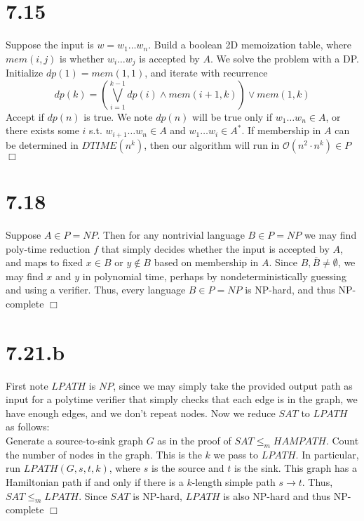 \documentclass{article}
\begin{document}
\section*{7.15}
Suppose the input is $w = w_1 \dots w_n$. Build a boolean 2D memoization table, where $mem(i,j)$ is whether $w_i\dots w_j$ is accepted by $A$. We solve the problem with a DP. Initialize $dp(1) = mem(1,1)$, and iterate with recurrence
$$dp(k) = \left(\bigvee_{i=1}^{k-1} dp(i) \wedge mem(i+1,k)\right) \vee mem(1,k)$$
Accept if $dp(n)$ is true. We note $dp(n)$ will be true only if $w_1 \dots w_n \in A$, or there exists some $i$ s.t. $w_{i+1}\dots w_n \in A$ and $w_1\dots w_i \in A^*$. If membership in $A$ can be determined in $DTIME(n^k)$, then our algorithm will run in $\mathcal{O}(n^2 \cdot n^k) \in P$ $\Box$

\section*{7.18}
Suppose $A \in P = NP$. Then for any nontrivial language $B \in P = NP$ we may find poly-time reduction $f$ that simply decides whether the input is accepted by $A$, and maps to fixed $x \in B$ or $y \notin B$ based on membership in $A$. Since $B,\overline{B} \neq \emptyset$, we may find $x$ and $y$ in polynomial time, perhaps by nondeterministically guessing and using a verifier. Thus, every language $B \in P = NP$ is NP-hard, and thus NP-complete $\Box$

\section*{7.21.b}
First note $LPATH$ is $NP$, since we may simply take the provided output path as input for a polytime verifier that simply checks that each edge is in the graph, we have enough edges, and we don't repeat nodes. Now we reduce $SAT$ to $LPATH$ as follows:\\
Generate a source-to-sink graph $G$ as in the proof of $SAT \leqslant_m HAMPATH$. Count the number of nodes in the graph. This is the $k$ we pass to $LPATH$. In particular, run $LPATH(G,s,t,k)$, where $s$ is the source and $t$ is the sink. This graph has a Hamiltonian path if and only if there is a $k$-length simple path $s \to t$. Thus, $SAT \leqslant_m LPATH$. Since $SAT$ is NP-hard, $LPATH$ is also NP-hard and thus NP-complete $\Box$
\end{document}
